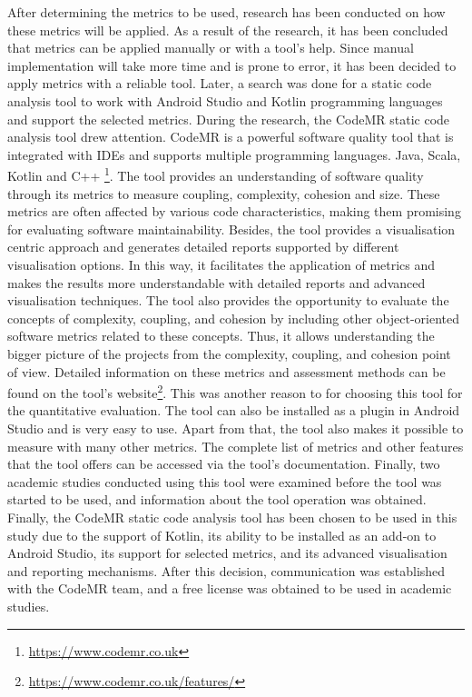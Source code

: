 After determining the metrics to be used, research has been conducted on how these metrics will be applied. As a result of the research, it has been concluded that metrics can be applied manually or with a tool's help. Since manual implementation will take more time and is prone to error, it has been decided to apply metrics with a reliable tool. Later, a search was done for a static code analysis tool to work with Android Studio and Kotlin programming languages and support the selected metrics. During the research, the CodeMR static code analysis tool drew attention. CodeMR is a powerful software quality tool that is integrated with IDEs and supports multiple programming languages. Java, Scala, Kotlin and C++ \footnote{\url{https://www.codemr.co.uk}}. The tool provides an understanding of software quality through its metrics to measure coupling, complexity, cohesion and size. These metrics are often affected by various code characteristics, making them promising for evaluating software maintainability.  Besides, the tool provides a visualisation centric approach and generates detailed reports supported by different visualisation options. In this way, it facilitates the application of metrics and makes the results more understandable with detailed reports and advanced visualisation techniques. The tool also provides the opportunity to evaluate the concepts of complexity, coupling, and cohesion by including other object-oriented software metrics related to these concepts. Thus, it allows understanding the bigger picture of the projects from the complexity, coupling, and cohesion point of view. Detailed information on these metrics and assessment methods can be found on the tool's website\footnote{\url{https://www.codemr.co.uk/features/}}. This was another reason to for choosing this tool for the quantitative evaluation. The tool can also be installed as a plugin in Android Studio and is very easy to use. Apart from that, the tool also makes it possible to measure with many other metrics. The complete list of metrics and other features that the tool offers can be accessed via the tool's documentation. Finally, two academic studies conducted using this tool were examined before the tool was started to be used, and information about the tool operation was obtained\cite{38}\cite{39}. Finally, the CodeMR static code analysis tool has been chosen to be used in this study due to the support of Kotlin, its ability to be installed as an add-on to Android Studio, its support for selected metrics, and its advanced visualisation and reporting mechanisms. After this decision, communication was established with the CodeMR team, and a free license was obtained to be used in academic studies. 

